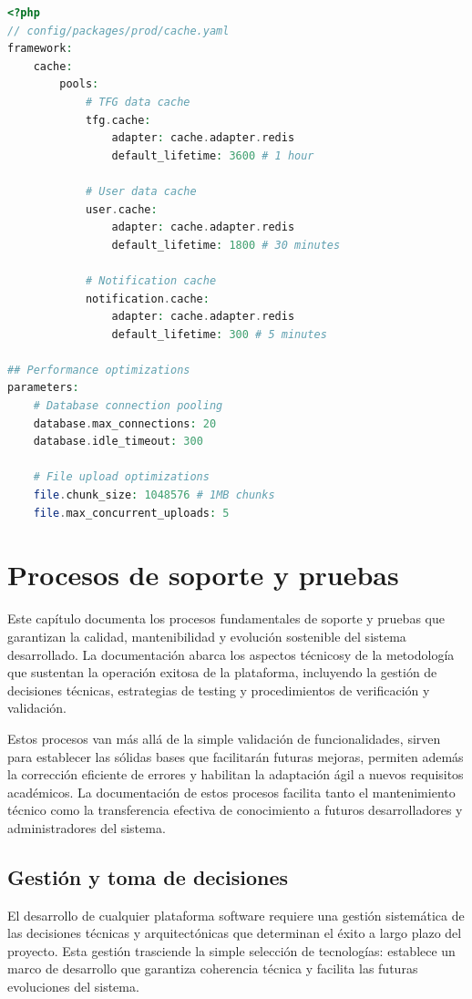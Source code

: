 \documentclass[12pt,a4paper,oneside]{report}
\begin{document}
\begin{lstlisting}[language=PHP]
<?php
// config/packages/prod/cache.yaml
framework:
    cache:
        pools:
            # TFG data cache
            tfg.cache:
                adapter: cache.adapter.redis
                default_lifetime: 3600 # 1 hour
                
            # User data cache  
            user.cache:
                adapter: cache.adapter.redis
                default_lifetime: 1800 # 30 minutes
                
            # Notification cache
            notification.cache:
                adapter: cache.adapter.redis
                default_lifetime: 300 # 5 minutes

## Performance optimizations
parameters:
    # Database connection pooling
    database.max_connections: 20
    database.idle_timeout: 300
    
    # File upload optimizations
    file.chunk_size: 1048576 # 1MB chunks
    file.max_concurrent_uploads: 5
\end{lstlisting}

\chapter{Procesos de soporte y
pruebas}\label{procesos-de-soporte-y-pruebas}
Este capítulo documenta los procesos fundamentales de soporte y pruebas que garantizan la calidad, mantenibilidad y evolución sostenible del sistema desarrollado. La documentación abarca los aspectos técnicosy de la metodología que sustentan la operación exitosa de la plataforma, incluyendo la gestión de decisiones técnicas, estrategias de testing y procedimientos de verificación y validación.

Estos procesos van más allá de la simple validación de funcionalidades, sirven para establecer las sólidas bases que facilitarán futuras mejoras, permiten además la corrección eficiente de errores y habilitan la adaptación ágil a nuevos requisitos académicos. La documentación de estos procesos facilita tanto el mantenimiento técnico como la transferencia efectiva de conocimiento a futuros desarrolladores y administradores del sistema.

\section{Gestión y toma de
decisiones}\label{gestiuxf3n-y-toma-de-decisiones}

El desarrollo de cualquier plataforma software requiere una gestión sistemática de las decisiones técnicas y arquitectónicas que determinan el éxito a largo plazo del proyecto. Esta gestión trasciende la simple selección de tecnologías: establece un marco de desarrollo que garantiza coherencia técnica y facilita las futuras evoluciones del sistema.
\end{document}
